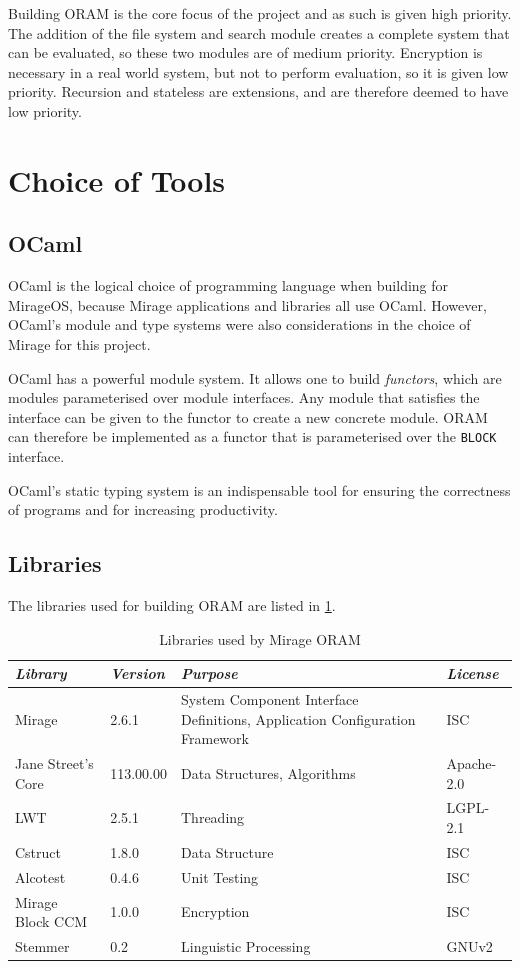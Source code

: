\documentclass[12pt,a4paper,twoside,openright]{report}
\begin{document}
Building ORAM is the core focus of the project and as such is given high priority. The addition of the file system and search module creates a complete system that can be evaluated, so these two modules are of medium priority. Encryption is necessary in a real world system, but not to perform evaluation, so it is given low priority. Recursion and stateless are extensions, and are therefore deemed to have low priority.

\section{Choice of Tools}

\subsection{OCaml}

OCaml is the logical choice of programming language when building for MirageOS, because Mirage applications and libraries all use OCaml. However, OCaml's module and type systems were also considerations in the choice of Mirage for this project.

OCaml has a powerful module system. It allows one to build \emph{functors}, which are modules parameterised over module interfaces. Any module that satisfies the interface can be given to the functor to create a new concrete module. ORAM can therefore be implemented as a functor that is parameterised over the \texttt{BLOCK} interface.

OCaml's static typing system is an indispensable tool for ensuring the correctness of programs and for increasing productivity.

\subsection{Libraries}
\label{subsec:libraries}

The libraries used for building ORAM are listed in \cref{tab:libraries}.

\begin{table}[h]
\centering
\begin{tabularx}{\textwidth}{|l|l|X|l|}
\hline
\textit{Library} & \textit{Version} & \textit{Purpose} & \textit{License} \\
\hline \hline
Mirage & 2.6.1 & System Component Interface Definitions, Application Configuration Framework & ISC \\
\hline
Jane Street's Core & 113.00.00 & Data Structures, Algorithms & Apache-2.0 \\
\hline
LWT & 2.5.1 & Threading & LGPL-2.1 \\
\hline
Cstruct & 1.8.0 & Data Structure & ISC \\
\hline
Alcotest & 0.4.6 & Unit Testing & ISC \\
\hline
Mirage Block CCM & 1.0.0 & Encryption & ISC \\
\hline
Stemmer & 0.2 & Linguistic Processing & GNUv2 \\
\hline
\end{tabularx}
\caption{Libraries used by Mirage ORAM}
\label{tab:libraries}
\end{table}
\end{document}
